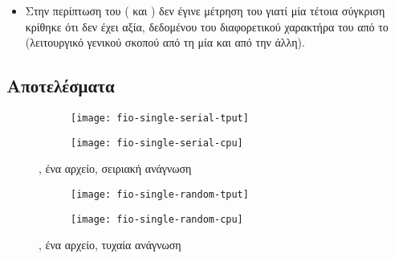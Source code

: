 \begin{itemize}
          σχετικό βοήθημα του %
          \footnote{}
          \cite{virtiofs-tests}. Το συγκεκριμένο ακυρώνει τις 
          και  χρησιμοποιώντας το 
          () %
          πριν από κάθε εκτέλεση του .
    \item Στην περίπτωση του \linux{} (\guest{} και \host{}) δεν έγινε μέτρηση
          του  γιατί μία τέτοια σύγκριση κρίθηκε ότι δεν έχει
          αξία, δεδομένου του διαφορετικού χαρακτήρα του από το \osv{}
          (λειτουργικό γενικού σκοπού από τη μία και  από την
          άλλη).
\end{itemize}

\subsection{Αποτελέσματα}

\begin{figure}
    \begin{minipage}[c][\textheight]{\textwidth}
        \begin{subfigure}[c][0.5\textheight]{\textwidth}
            \caption{}
            \texttt{[image: fio-single-serial-tput]}
            \label{fig:fio-single-serial-tput}
        \end{subfigure}
        \begin{subfigure}[c][0.5\textheight]{\textwidth}
            \caption{}
            \texttt{[image: fio-single-serial-cpu]}
            \label{fig:fio-single-serial-cpu}
        \end{subfigure}
        \caption{, ένα αρχείο, σειριακή ανάγνωση}
        \label{fig:fio-single-serial}
    \end{minipage}
\end{figure}

\begin{figure}
    \begin{minipage}[c][\textheight]{\textwidth}
        \begin{subfigure}[c][0.5\textheight]{\textwidth}
            \caption{}
            \texttt{[image: fio-single-random-tput]}
            \label{fig:fio-single-random-tput}
        \end{subfigure}
        \begin{subfigure}[c][0.5\textheight]{\textwidth}
            \caption{}
            \texttt{[image: fio-single-random-cpu]}
            \label{fig:fio-single-random-cpu}
        \end{subfigure}
        \caption{, ένα αρχείο, τυχαία ανάγνωση}
        \label{fig:fio-single-random}
    \end{minipage}
\end{figure}

